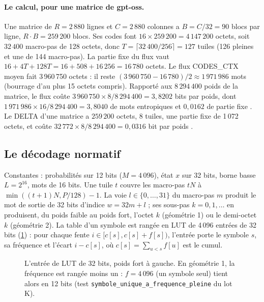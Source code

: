 \paragraph{Le calcul, pour une matrice de gpt-oss.} Une matrice de $R = 2\,880$ lignes et $C = 2\,880$ colonnes a $B = C/32 = 90$ blocs par ligne, $R \cdot B = 259\,200$ blocs. Ses codes font $16 \times 259\,200 = 4\,147\,200$ octets, soit $32\,400$ macro-pas de 128 octets, donc $T = \lceil 32\,400/256 \rceil = 127$ tuiles (126 pleines et une de 144 macro-pas). La partie fixe du flux vaut $16 + 4T + 128T = 16 + 508 + 16\,256 = 16\,780$ octets. Le flux CODES\_CTX moyen fait 3\,960\,750 octets : il reste $(3\,960\,750 - 16\,780)/2 \approx 1\,971\,986$ mots (bourrage d'au plus 15 octets compris). Rapporté aux $8\,294\,400$ poids de la matrice, le flux coûte $3\,960\,750 \times 8 / 8\,294\,400 = 3{,}8202$ bits par poids, dont $1\,971\,986 \times 16 / 8\,294\,400 = 3{,}8040$ de mots entropiques et $0{,}0162$ de partie fixe \calc. Le DELTA d'une matrice a $259\,200$ octets, 8 tuiles, une partie fixe de 1\,072 octets, et coûte $32\,772 \times 8 / 8\,294\,400 = 0{,}0316$ bit par poids \calc.

\subsection{Le décodage normatif}

Constantes : probabilités sur 12 bits ($M = 4\,096$), état $x$ sur 32 bits, borne basse $L = 2^{16}$, mots de 16 bits. Une tuile $t$ couvre les macro-pas $tN$ à $\min((t+1)N, P/128) - 1$. La voie $l \in \{0, \dots, 31\}$ du macro-pas $m$ produit le mot de sortie de 32 bits d'indice $w = 32m + l$ ; ses sous-pas $k = 0, 1, \dots$ en produisent, du poids faible au poids fort, l'octet $k$ (géométrie 1) ou le demi-octet $k$ (géométrie 2). La table d'un symbole est rangée en LUT de 4\,096 entrées de 32 bits (\cref{t2fmt:fig:lut}) : pour chaque fente $i \in [c[s], c[s] + f[s])$, l'entrée porte le symbole $s$, sa fréquence et l'écart $i - c[s]$, où $c[s] = \sum_{u<s} f[u]$ est le cumul.

\begin{figure}[ht]
\centering
\TdFmtLut
\caption[L'entrée de LUT de 32 bits]{L'entrée de LUT de 32 bits, poids fort à gauche. En géométrie 1, la fréquence est rangée moins un : $f = 4\,096$ (un symbole seul) tient alors en 12 bits (test \nolinkurl{symbole_unique_a_frequence_pleine} du lot K).}
\label{t2fmt:fig:lut}
\end{figure}

